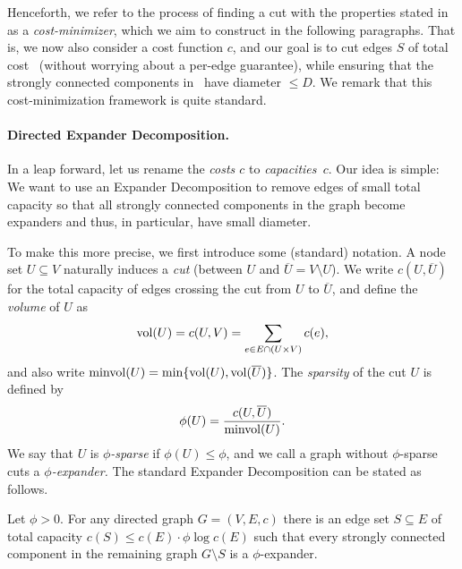 \documentclass[letterpaper,11pt]{article}
\begin{document}
Henceforth, we refer to the process of finding a cut with the properties stated in  as a \emph{cost-minimizer}, which we aim to construct in the following paragraphs. That is, we now also consider a cost function $c$, and our goal is to cut edges $S$ of total cost~ (without worrying about a per-edge guarantee), while ensuring that the strongly connected components in~ have diameter $\leq D$. We remark that this cost-minimization framework is quite standard.

\paragraph{Directed Expander Decomposition.}
In a leap forward, let us rename the \emph{costs $c$} to \emph{capacities~$c$}. Our idea is simple: We want to use an Expander Decomposition to remove edges of small total capacity so that all strongly connected components in the graph become expanders and thus, in particular, have small diameter.

To make this more precise, we first introduce some (standard) notation. A node set $U \subseteq V$ naturally induces a \emph{cut} (between $U$ and $\overline U = V \setminus U$). We write $c(U, \overline U)$ for the total capacity of edges crossing the cut from $U$ to $\overline U$, and define the \emph{volume} of $U$ as
\begin{equation*}
	\operatorname{vol}(U) = c(U, V) = \sum_{e \in E \cap (U \times V)} c(e),
\end{equation*}
and also write $\operatorname{minvol}(U) = \min\lbrace\operatorname{vol}(U), \operatorname{vol}(\overline U)\rbrace$. The \emph{sparsity} of the cut $U$ is defined by
\begin{equation*}
	\phi(U) = \frac{c(U, \overline U)}{\operatorname{minvol}(U)}.
\end{equation*}
We say that $U$ is \emph{$\phi$-sparse} if $\phi(U) \leq \phi$, and we call a graph without $\phi$-sparse cuts a \emph{$\phi$-expander.} The standard Expander Decomposition can be stated as follows.

\begin{lemma} \label{lem:exp-decomp}
Let $\phi > 0$. For any directed graph $G = (V, E, c)$ there is an edge set $S \subseteq E$ of total capacity $c(S) \leq c(E) \cdot \phi \log c(E)$ such that every strongly connected component in the remaining graph $G \setminus S$ is a $\phi$-expander.
\end{lemma}
\end{document}
